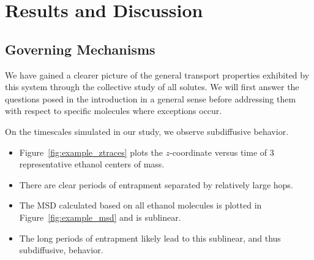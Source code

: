 \documentclass{article}
\begin{document}
  \section{Results and Discussion}
  
  \subsection*{Governing Mechanisms}\label{section:mechanism_overview}  
  
  We have gained a clearer picture of the general transport properties exhibited by
  this system through the collective study of all solutes. We will first answer the
  questions posed in the introduction in a general sense before addressing them with
  respect to specific molecules where exceptions occur.
  
  On the timescales simulated in our study, we observe subdiffusive behavior.  
  \begin{itemize}  
    \item Figure~\ref{fig:example_ztraces} plots the $z$-coordinate versus time of
  	3 representative ethanol centers of mass.
  	\item There are clear periods of entrapment separated by relatively large hops.
	\item The MSD calculated based on all ethanol molecules is plotted in Figure~\ref{fig:example_msd}
	and is sublinear.
	\item The long periods of entrapment likely lead to this sublinear, and thus
	subdiffusive, behavior.
  \end{itemize}
  
\end{document}

